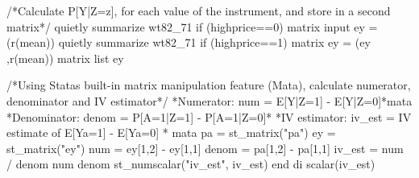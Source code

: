 \documentclass[
  10pt,
  a4paper,
]{book}
\newenvironment{Shaded}{\begin{snugshade}}{\end{snugshade}}
\newcommand{\CommentTok}[1]{\textcolor[rgb]{0.37,0.37,0.37}{#1}}
\newcommand{\FunctionTok}[1]{\textcolor[rgb]{0.28,0.35,0.67}{#1}}
\newcommand{\KeywordTok}[1]{\textcolor[rgb]{0.00,0.46,0.62}{#1}}
\newcommand{\NormalTok}[1]{\textcolor[rgb]{0.00,0.46,0.62}{#1}}
\newcommand{\OtherTok}[1]{\textcolor[rgb]{0.00,0.46,0.62}{#1}}
\newcommand{\StringTok}[1]{\textcolor[rgb]{0.13,0.47,0.30}{#1}}
\begin{document}
\begin{Shaded}
\begin{Highlighting}[]
\CommentTok{/*Calculate P[Y|Z=z], for each value of the instrument, }
\CommentTok{and store in a second matrix*/}
\KeywordTok{quietly} \KeywordTok{summarize}\NormalTok{ wt82\_71 }\KeywordTok{if}\NormalTok{ (highprice==0)}
\FunctionTok{matrix}\NormalTok{ input ey = (}\OtherTok{\textasciigrave{}r(mean)\textquotesingle{}}\NormalTok{)}
\KeywordTok{quietly} \KeywordTok{summarize}\NormalTok{ wt82\_71 }\KeywordTok{if}\NormalTok{ (highprice==1)}
\FunctionTok{matrix}\NormalTok{ ey = (ey ,}\OtherTok{\textasciigrave{}r(mean)\textquotesingle{}}\NormalTok{)}
\FunctionTok{matrix} \OtherTok{list}\NormalTok{ ey}

\CommentTok{/*Using Stata\textquotesingle{}s built{-}in matrix manipulation feature (Mata), }
\CommentTok{calculate numerator, denominator and IV estimator*/}
\NormalTok{*Numerator: num = E[Y|Z=1] {-} E[Y|Z=0]*}\KeywordTok{mata}
\NormalTok{*Denominator: denom = P[A=1|Z=1] {-} P[A=1|Z=0]*}
\NormalTok{*IV estimator: iv\_est = IV estimate }\KeywordTok{of}\NormalTok{ E[Ya=1] {-} E[Ya=0] *}
\KeywordTok{mata} 
\NormalTok{pa = st\_matrix(}\StringTok{"pa"}\NormalTok{)}
\NormalTok{ey = st\_matrix(}\StringTok{"ey"}\NormalTok{)}
\NormalTok{num = ey[1,2] {-} ey[1,1] }
\NormalTok{denom = pa[1,2] {-} pa[1,1]}
\NormalTok{iv\_est = num / denom }
\NormalTok{num}
\NormalTok{denom}
\NormalTok{st\_numscalar(}\StringTok{"iv\_est"}\NormalTok{, iv\_est)}
\KeywordTok{end}
\KeywordTok{di} \FunctionTok{scalar}\NormalTok{(iv\_est)}
\end{Highlighting}
\end{Shaded}
\end{document}
